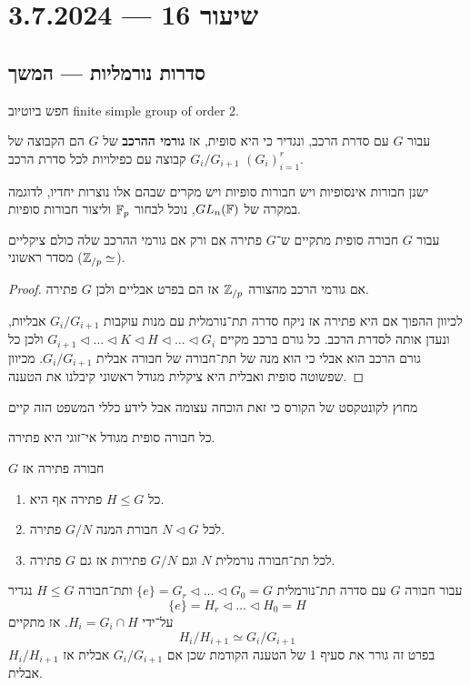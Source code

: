 \section{שיעור 16 --- 3.7.2024}

\subsection{סדרות נורמליות --- המשך}
חפש ביוטיוב finite simple group of order 2.
\begin{definition}
	עבור $G$ עם סדרת הרכב, ונגדיר כי היא סופית,
	אז \textbf{גורמי ההרכב} של $G$ הם הקבוצה של $G_i / G_{i + 1}$ קבוצה עם כפילויות לכל סדרת הרכב ${(G_i)}_{i = 1}^r$.
\end{definition}
ישנן חבורות אינסופיות ויש חבורות סופיות ויש מקרים שבהם אלו נוצרות יחדיו, לדוגמה במקרה של $GL_n(\mathbb{F})$, נוכל לבחור $\mathbb{F}_p$ וליצור חבורות סופיות.
\begin{proposition}
	עבור $G$ חבורה סופית מתקיים ש־$G$ פתירה אם ורק אם גורמי ההרכב שלה כולם ציקליים מסדר ראשוני ($\mathbb{Z}_{/p} \simeq$).
\end{proposition}
\begin{proof}
	אם גורמי הרכב מהצורה $\mathbb{Z}_{/p}$ אז הם בפרט אבליים ולכן $G$ פתירה.

	לכיוון ההפוך אם היא פתירה אז ניקח סדרה תת־נורמלית עם מנות עוקבות $G_i / G_{i + 1}$ אבליות, ונעדן אותה לסדרת הרכב.
	כל גורם ברכב מקיים $G_{i + 1} \triangleleft \dots \triangleleft K \triangleleft H \triangleleft \dots \triangleleft G_i$ ולכן כל גורם הרכב הוא אבלי כי הוא מנה של תת־חבורה של חבורה אבלית $G_i / G_{i + 1}$.
	מכיוון שפשוטה סופית ואבלית היא ציקלית מגודל ראשוני קיבלנו את הטענה.
\end{proof}
מחוץ לקונטקסט של הקורס כי זאת הוכחה עצומה אבל לידע כללי המשפט הזה קיים
\begin{theorem}
	כל חבורה סופית מגודל אי־זוגי היא פתירה.
\end{theorem}
\begin{proposition}
	$G$ חבורה פתירה אז
	\begin{enumerate}
		\item כל $H \le G$ פתירה אף היא.
		\item לכל $N \triangleleft G$ חבורת המנה $G/N$ פתירה.
		\item לכל תת־חבורה נורמלית $N$ וגם $G/N$ פתירות אז גם $G$ פתירה.
	\end{enumerate}
\end{proposition}
\begin{lemma}
	עבור חבורה $G$ עם סדרה תת־נורמלית $\{e\} = G_r \triangleleft \dots \triangleleft G_0 = G$ ותת־חבורה $H \le G$ נגדיר
	\[
		\{e\} = H_r \triangleleft \dots \triangleleft H_0 = H
	\]
	על־ידי $H_i = G_i \cap H$. אז מתקיים
	\[
		H_i / H_{i + 1} \simeq G_i / G_{i + 1}
	\]
	בפרט זה גורר את סעיף 1 של הטענה הקודמת שכן אם $G_i / G_{i + 1}$ אבלית אז $H_i / H_{i + 1}$ אבלית.
\end{lemma}
